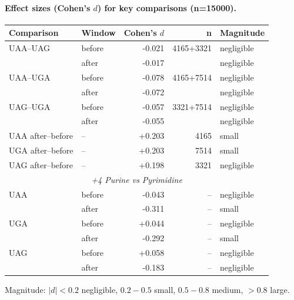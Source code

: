 \paragraph{Effect sizes (Cohen's $d$) for key comparisons (n=15000).}
\begin{center}\small
\begin{tabular}{llrrl}\toprule
Comparison & Window & Cohen's $d$ & n & Magnitude \\\midrule
UAA--UAG & before & -0.021 & 4165+3321 & negligible \\
 & after & -0.017 & & negligible \\
UAA--UGA & before & -0.078 & 4165+7514 & negligible \\
 & after & -0.072 & & negligible \\
UAG--UGA & before & -0.057 & 3321+7514 & negligible \\
 & after & -0.055 & & negligible \\
\midrule
UAA after--before & -- & +0.203 & 4165 & small \\
UGA after--before & -- & +0.203 & 7514 & small \\
UAG after--before & -- & +0.198 & 3321 & negligible \\
\midrule
\multicolumn{5}{c}{\textit{+4 Purine vs Pyrimidine}} \\
UAA & before & -0.043 & -- & negligible \\
 & after & -0.311 & -- & small \\
UGA & before & +0.044 & -- & negligible \\
 & after & -0.292 & -- & small \\
UAG & before & +0.058 & -- & negligible \\
 & after & -0.183 & -- & negligible \\
\bottomrule
\end{tabular}
\end{center}
\footnotesize Magnitude: $|d|<0.2$ negligible, $0.2{-}0.5$ small, $0.5{-}0.8$ medium, $>0.8$ large.
